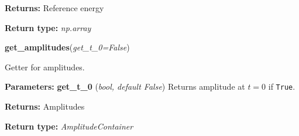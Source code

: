 \begin{tcolorbox}
{\begin{adjustwidth}{4em}{}
        \textbf{Returns:} Reference energy

        \textbf{Return type:} \emph{np.array}
        \end{adjustwidth}
    
    \hspace{2em} \textbf{get\_amplitudes}(\emph{get\_t\_0=False})
        \begin{adjustwidth}{4em}{}
        Getter for amplitudes.

        \textbf{Parameters:} \textbf{get\_t\_0} (\emph{bool, default False}) 
            Returns amplitude at $t=0$ if \lstinline{True}.

        \textbf{Returns:} Amplitudes

        \textbf{Return type:} \emph{AmplitudeContainer}

        \end{adjustwidth}

    }
\end{tcolorbox}